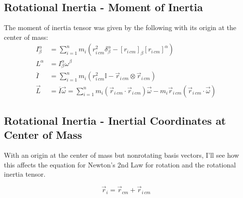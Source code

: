 \documentclass[10pt]{article}
\begin{document}
\subsection{Rotational Inertia - Moment of Inertia}

The moment of inertia tensor was given by the following with its origin at 
the center of mass:
\begin{align}
    I^\alpha_\beta &= \sum_{i=1}^n m_i(r^2_{i\,cm}\delta^\alpha_\beta - 
            [r_{i\,cm}]_\beta[r_{i\,cm}]^\alpha) \\
    L^\alpha &= I^\alpha_\beta\omega^\beta \\
    \overline{I} &= \sum_{i=1}^n m_i (r^2_{i\,cm}\mathbb{I} - 
        \vec{r}_{i\,cm}\otimes\vec{r}_{i\,cm}) \\
    \vec{L} &= \overline{I}\vec{\omega} = \sum_{i=1}^n 
        m_i(\vec{r}_{i\,cm}\cdot\vec{r}_{i\,cm})\vec{\omega} - 
        m_i\vec{r}_{i\,cm}(\vec{r}_{i\,cm}\cdot\vec{\omega})
\end{align}

\subsection{Rotational Inertia - Inertial Coordinates at Center of Mass}

With an origin at the center of mass but nonrotating basis vectors, I'll 
see how this affects the equation for Newton's 2nd Law for rotation and 
the rotational inertia tensor.

\begin{equation}
    \vec{r}_i = \vec{r}_{cm} + \vec{r}_{i\,cm} 
\end{equation}
\end{document}
